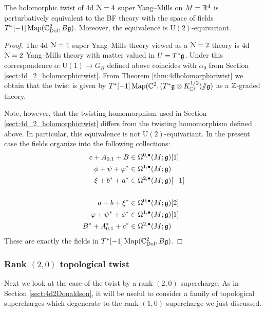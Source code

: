 \documentclass[10pt, oneside]{article}
\renewcommand{\U}{\mathrm{U}}
\newcommand{\ham}{/\!\!/}
\begin{document}
\begin{theorem}
The holomorphic twist of 4d $\mathcal N=4$ super Yang--Mills on $M=\mathbb R^4$ is perturbatively equivalent to the BF theory with the space of fields $T^*[-1] \operatorname{Map}(\mathbb C^2_{\rm Dol} , B \mathfrak g)$. Moreover, the equivalence is $\U(2)$-equivariant.
\label{thm:4d4holomorphictwist}
\end{theorem}
\begin{proof}
The 4d $\mathcal N=4$ super Yang--Mills theory viewed as a $\mathcal N=2$ theory is 4d $\mathcal N=2$ Yang--Mills theory with matter valued in $U=T^*\mathfrak g$. Under this correspondence $\alpha\colon \U(1)\rightarrow G_R$ defined above coincides with $\alpha_0$ from Section \ref{sect:4d_2_holomorphictwist}. From Theorem \ref{thm:4dholomorphictwist} we obtain that the twist is given by $T^*[-1] \map(\CC^2 , (T^*\fg\otimes K_{\CC^2}^{1/2})\ham \fg)$ as a $\mathbb Z$-graded theory.

Note, however, that the twisting homomorphism used in Section \ref{sect:4d_2_holomorphictwist} differs from the twisting homomorphism defined above. In particular, this equivalence is not $\U(2)$-equivariant. In the present case the fields organize into the following collections:
\begin{align*}
c+A_{0, 1}+B&\in\Omega^{0, \bullet}(M; \mathfrak g)[1] \\
\phi + \psi + \varphi^*&\in\Omega^{1, \bullet}(M; \mathfrak g) \\
\xi + b^* + a^*&\in\Omega^{2, \bullet}(M; \mathfrak g)[-1] \\
\\
a + b + \xi^*&\in\Omega^{0, \bullet}(M; \mathfrak g)[2] \\
\varphi + \psi^* + \phi^* &\in\Omega^{1, \bullet}(M; \mathfrak g)[1] \\
B^*+A^*_{0, 1}+ c^*&\in\Omega^{2, \bullet}(M; \mathfrak g)
\end{align*}
These are exactly the fields in $T^*[-1] \operatorname{Map}(\mathbb C^2_{\rm Dol} , B \mathfrak g)$.
\end{proof}

\subsubsection{Rank \texorpdfstring{$(2,0)$}{(2,0)} topological twist}
\label{sect:4d4Atwist}

Next we look at the case of the twist by a rank $(2,0)$ supercharge. 
As in Section \ref{sect:4d2Donaldson}, it will be useful to consider a family of topological supercharges which degenerate to the rank $(1,0)$ supercharge we just discussed. 
\end{document}
